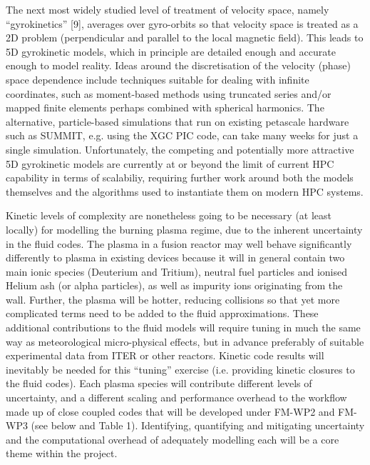 \documentclass{article}
\begin{document}
\vspace{24pt}
The next most widely studied level of treatment of velocity space, {\color{color29} namely 
``gyrokinetics'' [9], averages over gyro-orbits so that velocity space is treated 
as a 2D problem (perpendicular and parallel to the local magnetic field). This 
leads to 5D gyrokinetic models, which in principle }are detailed enough and accurate 
enough to model reality. Ideas around the discretisation of the velocity (phase) 
space dependence include techniques suitable for dealing with infinite coordinates, 
such as moment-based methods using truncated series and/or mapped finite elements 
perhaps combined with spherical harmonics. The alternative, particle-based simulations 
that run on existing petascale hardware such as SUMMIT, e.g. using the XGC PIC 
code, can take many weeks for just a single simulation. Unfortunately, the competing 
and potentially more attractive 5D gyrokinetic models are currently at or beyond 
the limit of current HPC capability in terms of scalabiliy, requiring further work 
around both the models themselves and the algorithms used to instantiate them on 
modern HPC systems.

\vspace{24pt}
Kinetic levels of complexity are nonetheless going to be necessary (at least locally) 
for modelling the burning plasma regime, due to the inherent uncertainty in the 
fluid codes. The plasma in a fusion reactor may well behave significantly differently 
to plasma in existing devices because it will in general contain two main ionic 
species (Deuterium and Tritium), neutral fuel particles and ionised Helium ash 
(or alpha particles), as well as impurity ions originating from the wall. Further, 
the plasma will be hotter, reducing collisions so that yet more complicated terms 
need to be added to the fluid approximations. These additional contributions to 
the fluid models will require tuning in much the same way as meteorological micro-physical 
effects, but in advance preferably of suitable experimental data from ITER or other 
reactors. Kinetic code results will inevitably be needed for this ``tuning'' exercise 
(i.e. providing kinetic closures to the fluid codes). Each plasma species will 
contribute different levels of uncertainty, and a different scaling and performance 
overhead to the workflow made up of close coupled codes that will be developed 
under FM-WP2 and FM-WP3 (see below and Table 1). Identifying, quantifying and mitigating 
uncertainty and the computational overhead of adequately modelling each will be 
a core theme within the project.
\end{document}
